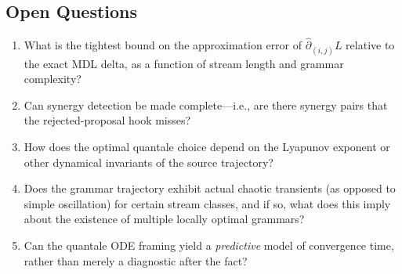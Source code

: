\documentclass[11pt]{article}
\begin{document}
\subsection*{Open Questions}
\begin{enumerate}
    \item What is the tightest bound on the approximation error of $\widehat{\partial}_{(i,j)} L$ relative to the exact MDL delta, as a function of stream length and grammar complexity?
    \item Can synergy detection be made complete---i.e., are there synergy pairs that the rejected-proposal hook misses?
    \item How does the optimal quantale choice depend on the Lyapunov exponent or other dynamical invariants of the source trajectory?
    \item Does the grammar trajectory exhibit actual chaotic transients (as opposed to simple oscillation) for certain stream classes, and if so, what does this imply about the existence of multiple locally optimal grammars?
    \item Can the quantale ODE framing yield a \emph{predictive} model of convergence time, rather than merely a diagnostic after the fact?
\end{enumerate}
\end{document}
